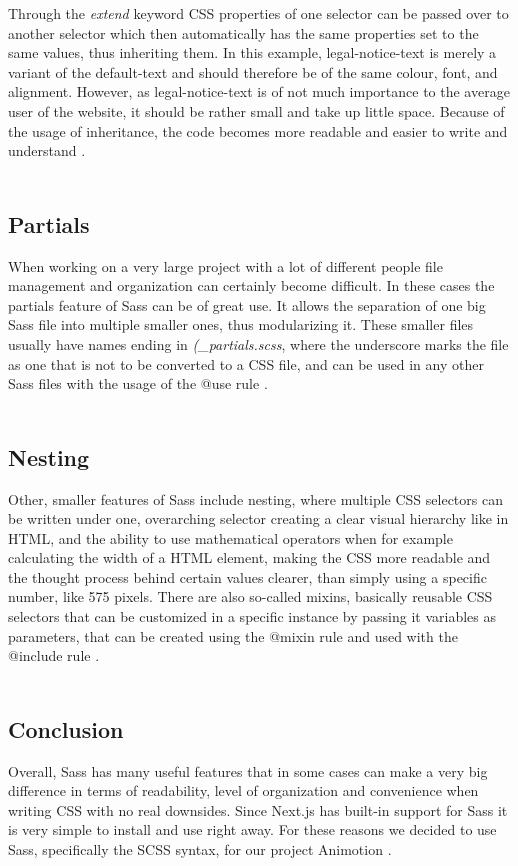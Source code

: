 Through the \emph{extend} keyword CSS properties of one selector can be passed over to another selector which then automatically has the 
same properties set to the same values, thus inheriting them. In this example, legal-notice-text is merely a variant of the 
default-text and should therefore be of the same colour, font, and alignment. However, as legal-notice-text is of not much 
importance to the average user of the website, it should be rather small and take up little space. Because of the usage of 
inheritance, the code becomes more readable and easier to write and understand \cite{SassFeatures}.
\\
\\
\subsection{Partials}
When working on a very large project with a lot of different people file management and organization can certainly become difficult. In
these cases the partials feature of Sass can be of great use. It allows the separation of one big Sass file into multiple smaller ones,
thus modularizing it. These smaller files usually have names ending in \emph{(\_partials.scss}, where the underscore marks the file as one
that is not to be converted to a CSS file, and can be used in any other Sass files with the usage of the @use rule \cite{SassFeatures}.
\\
\\
\subsection{Nesting}
Other, smaller features of Sass include nesting, where multiple CSS selectors can be written under one, overarching selector creating a
clear visual hierarchy like in HTML, and the ability to use mathematical operators when for example calculating the width of a HTML
element, making the CSS more readable and the thought process behind certain values clearer, than simply using a specific number, like
575 pixels. There are also so-called mixins, basically reusable CSS selectors that can be customized in a specific instance by passing it
variables as parameters, that can be created using the @mixin rule and used with the @include rule \cite{SassFeatures}.
\\
\\
\subsection{Conclusion}
Overall, Sass has many useful features that in some cases can make a very big difference in terms of readability, level of organization and
convenience when writing CSS with no real downsides. Since Next.js has built-in support for Sass it is very simple to install and use right
away. For these reasons we decided to use Sass, specifically the SCSS syntax, for our project Animotion \cite{NextjsCSSSupport}.
\\
\\
